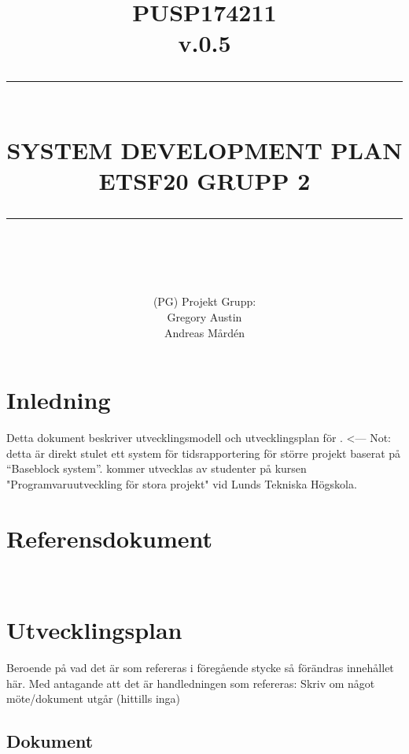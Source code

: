 \documentclass[paper=a4, fontsize=11pt,twoside]{article}
\title{ 														%
	\documentNumber{#1}											%
	\documentVersion{#2}											%
	\HRule{0.5pt} \\ %
	\LARGE \textbf{\uppercase{#3}} \\  									%
	\large \textbf{\uppercase{ETSF20 Grupp 2}}							%
	\HRule{2pt} \\ [0.5cm]      	%
	\normalsize          		%
	}															%
\author{#4}													%
\date{}                                           	%
\newcommand{\HRule}[1]{\rule{\linewidth}{#1}}   							%
\newcommand{\documentNumber}[1]{\centering PUSP1742#1 \\[1.0cm]}	 		%
\newcommand{\documentVersion}[1]{\centering \small{v.#1} \\[1.0cm]}	 		%
\newcommand{\grouptitlepage}[4]{										%
	\title{ 														%
	\documentNumber{#1}											%
	\documentVersion{#2}											%
	\HRule{0.5pt} \\ %
	\LARGE \textbf{\uppercase{#3}} \\  									%
	\large \textbf{\uppercase{ETSF20 Grupp 2}}							%
	\HRule{2pt} \\ [0.5cm]      	%
	\normalsize          		%
	}															%
	\author{#4}													%
	\maketitle														%
	\tableofcontents												%
	\thispagestyle{empty} 											%
	\newpage														%
}																%
\begin{document}
\grouptitlepage
{11}
{0.5}
{System Development Plan}
{(PG) Projekt Grupp: \\ Gregory Austin \\ Andreas Mårdén}	

\section{Inledning}
Detta dokument beskriver utvecklingsmodell och utvecklingsplan för {\color{red}{(Namn på produkt)-projektet}}. <--- Not: detta är direkt stulet {\color{red}{(Namn på produkt) (är)/(kommer bli)}} ett system för tidsrapportering för större projekt baserat på ``Baseblock system''. {\color{red}{(Namn på produkt)}} kommer utvecklas av studenter på kursen "Programvaruutveckling för stora projekt" vid Lunds Tekniska Högskola.

\section{Referensdokument}
{\color{red}{Referera här till (??????) Referens till handledningen kanske? Baseblock System?}}\\
{\color{red}{Referera till handledningen, CML SRS och SVVS... Tror jag...}}
{\color{red}{PUSP174210, PUSP174212, PUSP174213}}
\section{Utvecklingsplan}
Beroende på vad det är som refereras i föregående stycke så förändras innehållet här. Med antagande att det är handledningen som refereras: Skriv om något möte/dokument utgår (hittills inga)

\subsection*{Dokument}
\end{document}
